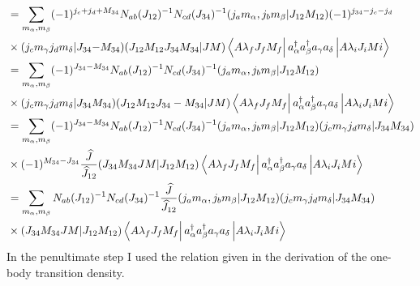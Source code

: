 \documentclass[12pt,a4paper]{article}
\newcommand{\matrixel}[3]{\left\langle #1 \vphantom{#2#3} \right|
 #2 \left| #3 \vphantom{#1#2} \right\rangle} %
\begin{document}
\begin{align}
\begin{split}
&=\sum_{m_{\alpha},m_{\beta}} (-1)^{j_c+j_d+M_{34}}N_{ab}(J_{12})^{-1}N_{cd}(J_{34})^{-1}(j_a m_{\alpha},j_bm_{\beta}|J_{12}M_{12})(-1)^{j_{34}-j_c-j_d}\\
&\times(j_cm_{\gamma}j_dm_{\delta}|J_{34}{-M_{34}}) (J_{12}M_{12}J_{34}M_{34}|JM)\matrixel{A\lambda_f J_f M_f}{a^\dagger_\alpha a^\dagger_{\beta}a_{\gamma }a_{\delta}}{A \lambda_i J_i Mi}\\
&=\sum_{m_{\alpha},m_{\beta}} (-1)^{J_{34}-M_{34}}N_{ab}(J_{12})^{-1}N_{cd}(J_{34})^{-1}(j_a m_{\alpha},j_bm_{\beta}|J_{12}M_{12})\\
&\times(j_cm_{\gamma}j_dm_{\delta}|J_{34}{M_{34}}) (J_{12}M_{12}J_{34}-M_{34}|JM)\matrixel{A\lambda_f J_f M_f}{a^\dagger_\alpha a^\dagger_{\beta}a_{\gamma }a_{\delta}}{A \lambda_i J_i Mi}\\
&=\sum_{m_{\alpha},m_{\beta}} (-1)^{J_{34}-M_{34}}N_{ab}(J_{12})^{-1}N_{cd}(J_{34})^{-1}(j_a m_{\alpha},j_bm_{\beta}|J_{12}M_{12})(j_cm_{\gamma}j_dm_{\delta}|J_{34}{M_{34}})\\
&\times(-1)^{M_{34}-J_{34}}\frac{\widehat{J}}{\widehat{J}_{12}} (J_{34}M_{34}JM|J_{12}M_{12})\matrixel{A\lambda_f J_f M_f}{a^\dagger_\alpha a^\dagger_{\beta}a_{\gamma }a_{\delta}}{A \lambda_i J_i Mi}\\
&=\sum_{m_{\alpha},m_{\beta}} N_{ab}(J_{12})^{-1}N_{cd}(J_{34})^{-1}\frac{\widehat{J}}{\widehat{J}_{12}} (j_a m_{\alpha},j_bm_{\beta}|J_{12}M_{12})(j_cm_{\gamma}j_dm_{\delta}|J_{34}{M_{34}})\\
&\times(J_{34}M_{34}JM|J_{12}M_{12})\matrixel{A\lambda_f J_f M_f}{a^\dagger_\alpha a^\dagger_{\beta}a_{\gamma }a_{\delta}}{A \lambda_i J_i Mi}
\end{split}
\end{align}
In the penultimate step I used the relation given in the derivation of the one-body transition density.
\end{document}
